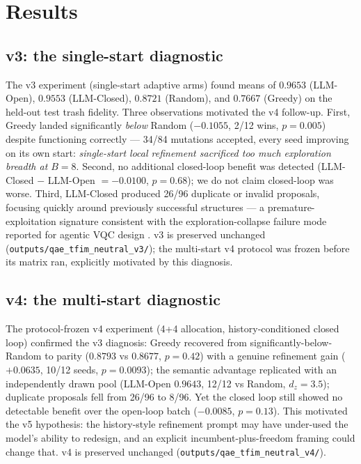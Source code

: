 \documentclass[11pt]{article}
\begin{document}
\section{Results}

\subsection{v3: the single-start diagnostic}

The v3 experiment (single-start adaptive arms) found means of $0.9653$ (LLM-Open), $0.9553$ (LLM-Closed), $0.8721$ (Random), and $0.7667$ (Greedy) on the held-out test trash fidelity.
Three observations motivated the v4 follow-up.
First, Greedy landed significantly \emph{below} Random ($-0.1055$, 2/12 wins, $p=0.005$) despite functioning correctly --- 34/84 mutations accepted, every seed improving on its own start: \emph{single-start local refinement sacrificed too much exploration breadth at $B=8$}.
Second, no additional closed-loop benefit was detected (LLM-Closed $-$ LLM-Open $=-0.0100$, $p=0.68$); we do not claim closed-loop was worse.
Third, LLM-Closed produced 26/96 duplicate or invalid proposals, focusing quickly around previously successful structures --- a premature-exploitation signature consistent with the exploration-collapse failure mode reported for agentic VQC design \cite{knipfer2026}.
v3 is preserved unchanged (\texttt{outputs/qae\_tfim\_neutral\_v3/}); the multi-start v4 protocol was frozen before its matrix ran, explicitly motivated by this diagnosis.

\subsection{v4: the multi-start diagnostic}

The protocol-frozen v4 experiment (4+4 allocation, history-conditioned closed loop) confirmed the v3 diagnosis: Greedy recovered from significantly-below-Random to parity ($0.8793$ vs $0.8677$, $p=0.42$) with a genuine refinement gain ($+0.0635$, 10/12 seeds, $p=0.0093$); the semantic advantage replicated with an independently drawn pool (LLM-Open $0.9643$, 12/12 vs Random, $d_z=3.5$); duplicate proposals fell from 26/96 to 8/96.
Yet the closed loop still showed no detectable benefit over the open-loop batch ($-0.0085$, $p=0.13$).
This motivated the v5 hypothesis: the history-style refinement prompt may have under-used the model's ability to redesign, and an explicit incumbent-plus-freedom framing could change that.
v4 is preserved unchanged (\texttt{outputs/qae\_tfim\_neutral\_v4/}).
\end{document}
